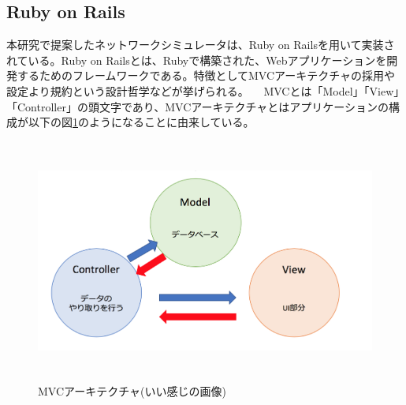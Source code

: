 \subsection{Ruby on Rails}
\label{tag:rails}
本研究で提案したネットワークシミュレータは、Ruby on Railsを用いて実装されている。Ruby on Railsとは、Rubyで構築された、Webアプリケーションを開発するためのフレームワークである。特徴としてMVCアーキテクチャの採用や設定より規約という設計哲学などが挙げられる。
　MVCとは「Model」「View」「Controller」の頭文字であり、MVCアーキテクチャとはアプリケーションの構成が以下の図\ref{fig:MVC}のようになることに由来している。

\begin{figure}[htbp]
  \begin{center}
    \includegraphics[clip,width=12.0cm,height=8.0cm]{img/mvc.png}
    \caption{MVCアーキテクチャ(いい感じの画像)}
    \label{fig:MVC}
  \end{center}
\end{figure}
